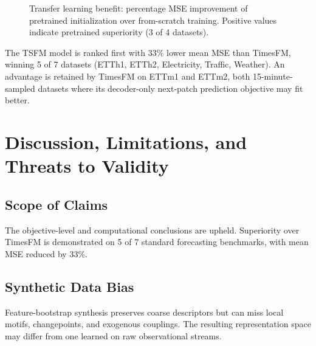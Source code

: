 \documentclass[journal]{IEEEtran}
\begin{document}
\begin{figure}[t]
\centering
{}
\caption{Transfer learning benefit: percentage MSE improvement of pretrained initialization over from-scratch training. Positive values indicate pretrained superiority (3 of 4 datasets).}
\label{fig:finetune_improvement}
\end{figure}

The TSFM model is ranked first with 33\% lower mean MSE than TimesFM, winning 5 of 7 datasets (ETTh1, ETTh2, Electricity, Traffic, Weather). An advantage is retained by TimesFM on ETTm1 and ETTm2, both 15-minute-sampled datasets where its decoder-only next-patch prediction objective may fit better.

\section{Discussion, Limitations, and Threats to Validity}
\subsection{Scope of Claims}
The objective-level and computational conclusions are upheld. Superiority over TimesFM \cite{timesfm} is demonstrated on 5 of 7 standard forecasting benchmarks, with mean MSE reduced by 33\%.

\subsection{Synthetic Data Bias}
Feature-bootstrap synthesis preserves coarse descriptors but can miss local motifs, changepoints, and exogenous couplings. The resulting representation space may differ from one learned on raw observational streams.
\end{document}

